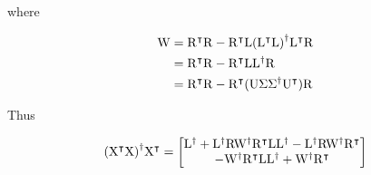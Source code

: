 \documentclass[twocolumn,draft]{article}
\begin{document}
where

\begin{align}
	\rmW &= \trans{\rmR}\rmR
	- \trans{\rmR}\rmL\pinv{(\trans{\rmL}\rmL)}\trans{\rmL}\rmR \\
	  &= \trans{\rmR}\rmR - \trans{\rmR}\rmL\pinv{\rmL}\rmR \\
		&= \trans{\rmR}\rmR - \trans{\rmR}(\rmU\Sigma\pinv{\Sigma}\trans{\rmU})\rmR
\end{align}

Thus

\begin{equation}
	\pinv{(\trans{\rmX}\rmX)}\trans{\rmX} =
		\begin{bmatrix}
			\pinv{\rmL} + \pinv{\rmL}\rmR\pinv{\rmW}\trans{\rmR}\rmL\pinv{\rmL}
			-\pinv{\rmL}\rmR\pinv{\rmW}\trans{\rmR}\\
			-\pinv{\rmW}\trans{\rmR}\rmL\pinv{\rmL} + \pinv{\rmW}\trans{\rmR}
		\end{bmatrix}
\end{equation}

\printbibliography\
\end{document}
